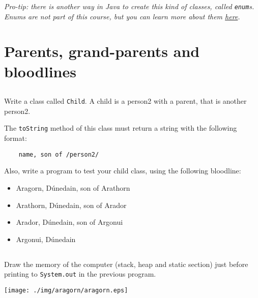 \documentclass[a4paper, 11pt]{article}
\begin{document}
\textsl{Pro-tip: there is another way in Java to create this kind of classes,
called \texttt{enum}s. Enums are not part of this course, but you can learn
more about them
\href{http://docs.oracle.com/javase/tutorial/java/javaOO/enum.html}{here}.}

















\section{Parents, grand-parents and bloodlines}

\subsection{}

Write a class called \verb+Child+. A child is a person2 with a parent, that is
another person2.

The \verb+toString+ method of this class must return a string with the
following format:

\verb+    name, son of /person2/+

Also, write a program to test your child class, using the following bloodline:

\begin{itemize}

  \item Aragorn, Dúnedain, son of Arathorn

  \item Arathorn, Dúnedain, son of Arador

  \item Arador, Dúnedain, son of Argonui

  \item Argonui, Dúnedain

\end{itemize}













\subsection{}

Draw the memory of the computer (stack, heap and static section) just before
printing to \verb+System.out+ in the previous program.

\begin{solution}
  \texttt{[image: ./img/aragorn/aragorn.eps]}
\end{solution}
\end{document}
